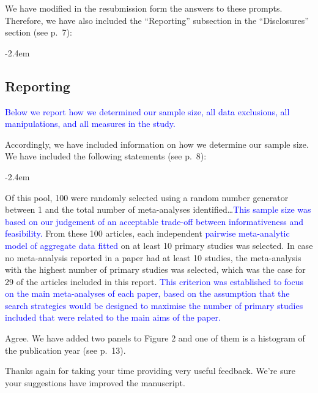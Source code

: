 \documentclass[draft]{article}
\renewenvironment{quote}{\begin{fquote}\advance\leftmargini -2.4em\begin{oldquote}}{\end{oldquote}\end{fquote}}
\newenvironment{fquote}
  {\def\FrameCommand{
	\fboxsep=0.6em %
	\fcolorbox{black}{white}}%
    \MakeFramed {\advance\hsize-2\width \FrameRestore}
    \begin{minipage}{\linewidth}
  }
  {\end{minipage}\endMakeFramed}
\begin{document}
We have modified in the resubmission form the answers to these prompts. Therefore, we have also included the ``Reporting'' subsection in the ``Disclosures'' section (see p.~7):

\begin{quote}
\hypertarget{reporting}{%
\subsection{Reporting}\label{reporting}}

\textcolor{blue}{Below we report how we determined our sample size, all data exclusions, all manipulations, and all measures in the study.}
\end{quote}

Accordingly, we have included information on how we determine our sample size. We have included the following statements (see p.~8):

\begin{quote}
Of this pool, 100 were randomly selected using a random number generator between 1 and the total number of meta-analyses identified\ldots{}\textcolor{blue}{This sample size was based on our judgement of an acceptable trade-off between informativeness and feasibility.}
From these 100 articles, each independent \textcolor{blue} {pairwise meta-analytic model of aggregate data fitted} on at least 10 primary studies was selected. In case no meta-analysis reported in a paper had at least 10 studies, the meta-analysis with the highest number of primary studies was selected, which was the case for 29 of the articles included in this report. \textcolor{blue}{This criterion was established to focus on the main meta-analyses of each paper, based on the assumption that the search strategies would be designed to maximise the number of primary studies included that were related to the main aims of the paper.}
\end{quote}


Agree. We have added two panels to Figure 2 and one of them is a histogram of the publication year (see p.~13).

Thanks again for taking your time providing very useful feedback. We're sure your suggestions have improved the manuscript.
\end{document}
